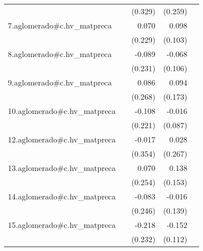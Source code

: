 {\begin{longtable}{l*{4}{D{.}{.}{-1}}}
            &                     &     (0.329)         &     (0.259)         &                     \\
\addlinespace
7.aglomerado#c.hv\_matpreca&                     &       0.070         &       0.098         &                     \\
            &                     &     (0.229)         &     (0.103)         &                     \\
\addlinespace
8.aglomerado#c.hv\_matpreca&                     &      -0.089         &      -0.068         &                     \\
            &                     &     (0.231)         &     (0.106)         &                     \\
\addlinespace
9.aglomerado#c.hv\_matpreca&                     &       0.086         &       0.094         &                     \\
            &                     &     (0.268)         &     (0.173)         &                     \\
\addlinespace
10.aglomerado#c.hv\_matpreca&                     &      -0.108         &      -0.016         &                     \\
            &                     &     (0.221)         &     (0.087)         &                     \\
\addlinespace
12.aglomerado#c.hv\_matpreca&                     &      -0.017         &       0.028         &                     \\
            &                     &     (0.354)         &     (0.267)         &                     \\
\addlinespace
13.aglomerado#c.hv\_matpreca&                     &       0.070         &       0.138         &                     \\
            &                     &     (0.254)         &     (0.153)         &                     \\
\addlinespace
14.aglomerado#c.hv\_matpreca&                     &      -0.083         &      -0.016         &                     \\
            &                     &     (0.246)         &     (0.139)         &                     \\
\addlinespace
15.aglomerado#c.hv\_matpreca&                     &      -0.218         &      -0.152         &                     \\
            &                     &     (0.232)         &     (0.112)         &                     \\

\end{longtable}}
